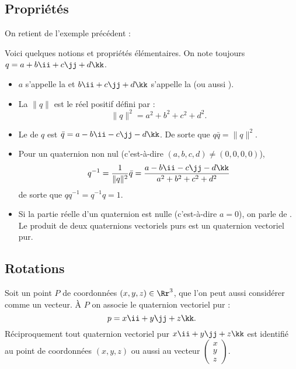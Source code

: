 \documentclass[11pt,class=report,crop=false]{standalone}
\begin{document}
\subsection{Propriétés}

On retient de l'exemple précédent :

Voici quelques notions et propriétés élémentaires. On note toujours $q = a + b\ii +c\jj +d\kk$.

\begin{itemize}
  \item $a$ s'appelle la  et $b\ii +c\jj +d\kk$ s'appelle la  (ou aussi ).

  \item La  $\|q\|$ est le réel positif défini par :
  $$\|q\|^2 = a^2 + b^2 +c^2 +d^2.$$

  \item Le  de $q$ est $\bar q =  a - b\ii -c\jj -d\kk$. De sorte que $q \bar q = \|q\|^2$.

  \item Pour un quaternion non nul (c'est-à-dire $(a,b,c,d) \neq (0,0,0,0)$), $$q^{-1} = \frac{1}{\|q\|^2} \bar q = \frac{a - b\ii -c\jj -d\kk}{a^2+b^2+c^2+d^2}$$
  de sorte que $q q^{-1} = q^{-1}q = 1$.

  \item   Si la partie réelle d'un quaternion est nulle (c'est-à-dire $a=0$), on parle de . Le produit de deux quaternions vectoriels purs est un quaternion vectoriel pur.
\end{itemize}


\subsection{Rotations}

Soit un point $P$ de coordonnées $(x,y,z) \in \Rr^3$, que l'on peut aussi considérer comme un vecteur. À $P$ on associe le quaternion vectoriel pur :
$$p = x\ii + y\jj + z\kk.$$
Réciproquement tout quaternion vectoriel pur $x\ii + y\jj + z\kk$ est identifié au point de coordonnées $(x,y,z)$ ou aussi au vecteur $\left(\begin{smallmatrix}x\\y\\z\end{smallmatrix}\right)$.
\end{document}
